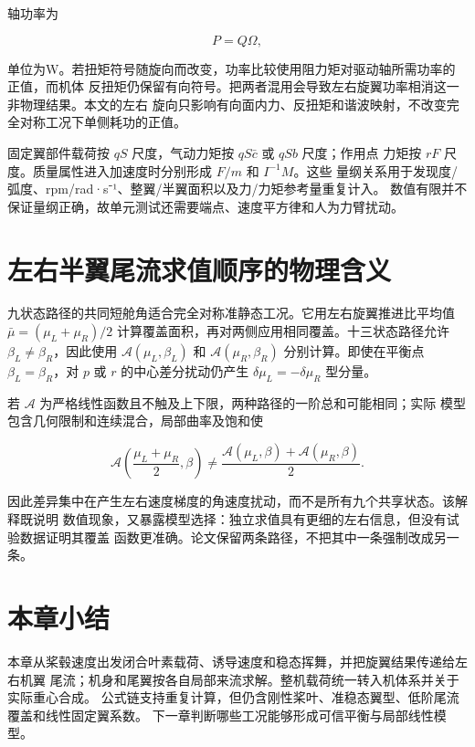 \documentclass[UTF8,12pt,oneside,openany,fontset=windows]{ctexbook}
\begin{document}
轴功率为

\begin{equation}
P=Q\Omega,
\end{equation}

单位为W。若扭矩符号随旋向而改变，功率比较使用阻力矩对驱动轴所需功率的正值，而机体 反扭矩仍保留有向符号。把两者混用会导致左右旋翼功率相消这一非物理结果。本文的左右 旋向只影响有向面内力、反扭矩和谐波映射，不改变完全对称工况下单侧耗功的正值。

固定翼部件载荷按 \(qS\) 尺度，气动力矩按 \(qS\bar c\) 或 \(qSb\) 尺度；作用点 力矩按 \(rF\) 尺度。质量属性进入加速度时分别形成 \(F/m\) 和 \(I^{-1}M\)。这些 量纲关系用于发现度/弧度、rpm/rad·s⁻¹、整翼/半翼面积以及力/力矩参考量重复计入。 数值有限并不保证量纲正确，故单元测试还需要端点、速度平方律和人为力臂扰动。

\section{左右半翼尾流求值顺序的物理含义}

九状态路径的共同短舱角适合完全对称准静态工况。它用左右旋翼推进比平均值 \(\bar\mu=(\mu_L+\mu_R)/2\) 计算覆盖面积，再对两侧应用相同覆盖。十三状态路径允许 \(\beta_L\ne\beta_R\)，因此使用 \(\mathcal A(\mu_L,\beta_L)\) 和 \(\mathcal A(\mu_R,\beta_R)\) 分别计算。即使在平衡点 \(\beta_L=\beta_R\)，对 \(p\) 或 \(r\) 的中心差分扰动仍产生 \(\delta\mu_L=-\delta\mu_R\) 型分量。

若 \(\mathcal A\) 为严格线性函数且不触及上下限，两种路径的一阶总和可能相同；实际 模型包含几何限制和连续混合，局部曲率及饱和使

\begin{equation}
\mathcal A\!\left(\frac{\mu_L+\mu_R}{2},\beta\right)
\ne\frac{\mathcal A(\mu_L,\beta)+\mathcal A(\mu_R,\beta)}{2}.
\end{equation}

因此差异集中在产生左右速度梯度的角速度扰动，而不是所有九个共享状态。该解释既说明 数值现象，又暴露模型选择：独立求值具有更细的左右信息，但没有试验数据证明其覆盖 函数更准确。论文保留两条路径，不把其中一条强制改成另一条。

\section{本章小结}

本章从桨毂速度出发闭合叶素载荷、诱导速度和稳态挥舞，并把旋翼结果传递给左右机翼 尾流；机身和尾翼按各自局部来流求解。整机载荷统一转入机体系并关于实际重心合成。 公式链支持重复计算，但仍含刚性桨叶、准稳态翼型、低阶尾流覆盖和线性固定翼系数。 下一章判断哪些工况能够形成可信平衡与局部线性模型。
\end{document}
